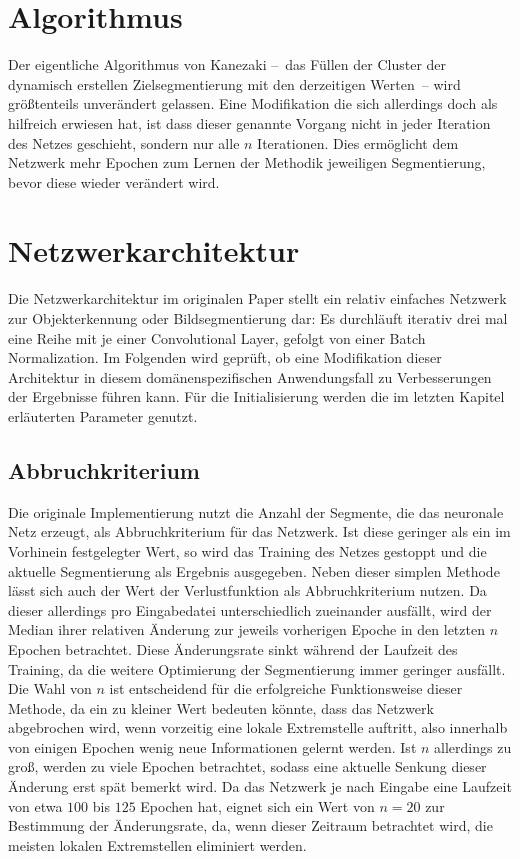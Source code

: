 \section{Algorithmus}
\label{sec:algorithm}

Der eigentliche Algorithmus von Kanezaki --~das Füllen der Cluster der dynamisch erstellen Zielsegmentierung mit den derzeitigen Werten~-- wird größtenteils unverändert gelassen. Eine Modifikation die sich allerdings doch als hilfreich erwiesen hat, ist dass dieser genannte Vorgang nicht in jeder Iteration des Netzes geschieht, sondern nur alle $n$ Iterationen. Dies ermöglicht dem Netzwerk mehr Epochen zum Lernen der Methodik jeweiligen Segmentierung, bevor diese wieder verändert wird.

\section{Netzwerkarchitektur}
\label{sec:network_architecture}

Die Netzwerkarchitektur im originalen Paper stellt ein relativ einfaches Netzwerk zur Objekterkennung oder Bildsegmentierung dar: Es durchläuft iterativ drei mal eine Reihe mit je einer Convolutional Layer, gefolgt von einer Batch Normalization. Im Folgenden wird geprüft, ob eine Modifikation dieser Architektur in diesem domänenspezifischen Anwendungsfall zu Verbesserungen der Ergebnisse führen kann. Für die Initialisierung werden die im letzten Kapitel erläuterten Parameter genutzt.

\subsection{Abbruchkriterium}
\label{ssec:stoppingcriteria}

Die originale Implementierung nutzt die Anzahl der Segmente, die das neuronale Netz erzeugt, als Abbruchkriterium für das Netzwerk. Ist diese geringer als ein im Vorhinein festgelegter Wert, so wird das Training des Netzes gestoppt und die aktuelle Segmentierung als Ergebnis ausgegeben. Neben dieser simplen Methode lässt sich auch der Wert der Verlustfunktion als Abbruchkriterium nutzen. Da dieser allerdings pro Eingabedatei unterschiedlich zueinander ausfällt, wird der Median ihrer relativen Änderung zur jeweils vorherigen Epoche in den letzten $n$ Epochen betrachtet. Diese Änderungsrate sinkt während der Laufzeit des Training, da die weitere Optimierung der Segmentierung immer geringer ausfällt. Die Wahl von $n$ ist entscheidend für die erfolgreiche Funktionsweise dieser Methode, da ein zu kleiner Wert bedeuten könnte, dass das Netzwerk abgebrochen wird, wenn vorzeitig eine lokale Extremstelle auftritt, also \zB innerhalb von einigen Epochen wenig neue Informationen gelernt werden. Ist $n$ allerdings zu groß, werden zu viele Epochen betrachtet, sodass eine aktuelle Senkung dieser Änderung erst spät bemerkt wird. Da das Netzwerk je nach Eingabe eine Laufzeit von etwa $100$ bis $125$ Epochen hat, eignet sich ein Wert von $n=20$ zur Bestimmung der Änderungsrate, da, wenn dieser Zeitraum betrachtet wird, die meisten lokalen Extremstellen eliminiert werden.

